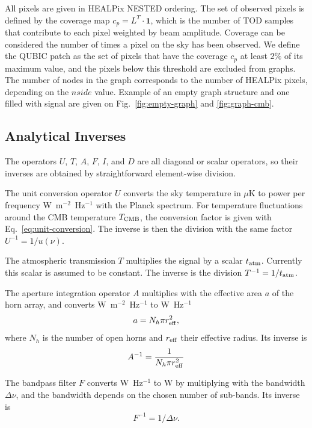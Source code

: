 \documentclass[a4paper,11pt]{article}
\begin{document}
All pixels are given in HEALPix NESTED ordering. The set of observed pixels is defined by the coverage map $c_p = L^T \cdot \mathbf{1}$, which is the number of TOD samples that contribute to each pixel weighted by beam amplitude. Coverage can be considered the number of times a pixel on the sky has been observed. We define the QUBIC patch as the set of pixels that have the coverage $c_p$ at least $2\%$ of its maximum value, and the pixels below this threshold are excluded from graphs. The number of nodes in the graph corresponds to the number of HEALPix pixels, depending on the $nside$ value. Example of an empty graph structure and one filled with signal are given on Fig.~\ref{fig:empty-graph} and \ref{fig:graph-cmb}.


\subsection{Analytical Inverses}
\label{subsec:exact-inverses}

The operators $U$, $T$, $A$, $F$, $I$, and $D$ are all diagonal or scalar operators, so their inverses are obtained by straightforward element-wise division.

The unit conversion operator $U$ converts the sky temperature in $\mu$K to
power per frequency W~m$^{-2}$~Hz$^{-1}$ with the Planck spectrum. For temperature fluctuations around the CMB temperature $T_{\rm CMB}$, the conversion factor is given with Eq.~\ref{eq:unit-conversion}. The inverse is then the division with the same factor $U^{-1} = 1/u(\nu)$.

The atmospheric transmission $T$ multiplies the signal by a scalar $t_{\rm atm}$. Currently this scalar is assumed to be constant. The inverse is the division $T^{-1} = 1/t_{\rm atm}$.

The aperture integration operator $A$ multiplies with the effective area $a$ of the horn array, and converts W~m$^{-2}$~Hz$^{-1}$ to W~Hz$^{-1}$
\begin{equation}
    a = N_h \pi r_{\rm eff}^2,
\end{equation}
where $N_h$ is the number of open horns and $r_{\rm eff}$ their effective radius. Its inverse is 
\begin{equation}
    A^{-1} = \frac{1}{N_h \pi r_{\rm eff}^2}
\end{equation}

The bandpass filter $F$ converts W~Hz$^{-1}$ to W by multiplying with the bandwidth $\Delta\nu$, and the bandwidth depends on the chosen number of sub-bands. Its inverse is
\begin{equation}
    F^{-1} = 1 / \Delta\nu.
\end{equation}
\end{document}
